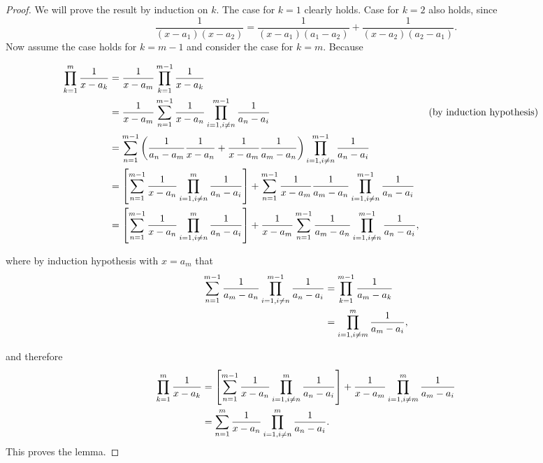 \documentclass{report}
\begin{document}
 \begin{proof}
     We will prove the result by induction on $k$. The case for $k =1$ clearly holds. Case for $k =2$
     also holds, since
     \[ 
         \frac{1}{(x-a_1)(x-a_2)} = \frac{1}{(x-a_1)(a_1 - a_2)} + \frac{1}{(x-a_2)(a_2 - a_1)}.
     \]
     Now assume the case holds for $k = m-1$ and consider the case for $k =m$. Because
 
     \begin{align*}
         \prodk[1]{m} \frac{1}{x - a_k} &= \frac{1}{x - a_m} \prodk[1]{m-1} \frac{1}{x - a_k}
         \\
         &= \frac{1}{x - a_m} \sumn[1]{m-1} \frac{1}{x-a_n} \prod_{\substack{i = 1, i\neq n}}^{m-1} \frac{1}{a_n -a_i} &&\text{(by induction hypothesis)}
         \\
         &= \sumn[1]{m-1} \left( \frac{1}{a_n - a_m} \frac{1}{x -a_n} + \frac{1}{x-a_m}\frac{1}{a_m - a_n}\right) \prod_{\substack{i = 1, i\neq n}}^{m-1} \frac{1}{a_n -a_i}
         \\
         &= \left[\sumn[1]{m-1} \frac{1}{x-a_n} \prod_{\substack{i = 1, i\neq n}}^{m} \frac{1}{a_n -a_i}\right] + \sumn[1]{m-1} \frac{1}{x-a_m} \frac{1}{a_m - a_n} \prod_{\substack{i = 1, i\neq n}}^{m-1} \frac{1}{a_n -a_i}
         \\
         &= \left[\sumn[1]{m-1} \frac{1}{x-a_n} \prod_{\substack{i = 1, i\neq n}}^{m} \frac{1}{a_n -a_i}\right] + \frac{1}{x-a_m}\sumn[1]{m-1}  \frac{1}{a_m - a_n} \prod_{\substack{i = 1, i\neq n}}^{m-1} \frac{1}{a_n -a_i},
     \end{align*}
 
 where by induction hypothesis with $x = a_m$ that
 \begin{align*}
     \sumn[1]{m-1}  \frac{1}{a_m - a_n} \prod_{\substack{i = 1, i\neq n}}^{m-1} \frac{1}{a_n -a_i} &= \prodk[1]{m-1} \frac{1}{a_m - a_k}
     \\
     &= \prod_{\substack{i = 1, i\neq m}}^{m} \frac{1}{a_m -a_i},
 \end{align*}
 
 and therefore
 \begin{align*}
     \prodk[1]{m} \frac{1}{x - a_k} &=  \left[\sumn[1]{m-1} \frac{1}{x-a_n} \prod_{\substack{i = 1, i\neq n}}^{m} \frac{1}{a_n -a_i}\right] + \frac{1}{x-a_m}\prod_{\substack{i = 1, i\neq m}}^{m} \frac{1}{a_m -a_i}
     \\
     &= \sumn[1]{m} \frac{1}{x-a_n} \prod_{\substack{i = 1, i\neq n}}^{m} \frac{1}{a_n -a_i}.
 \end{align*}
 This proves the lemma.
 \end{proof}
 
\end{document}
